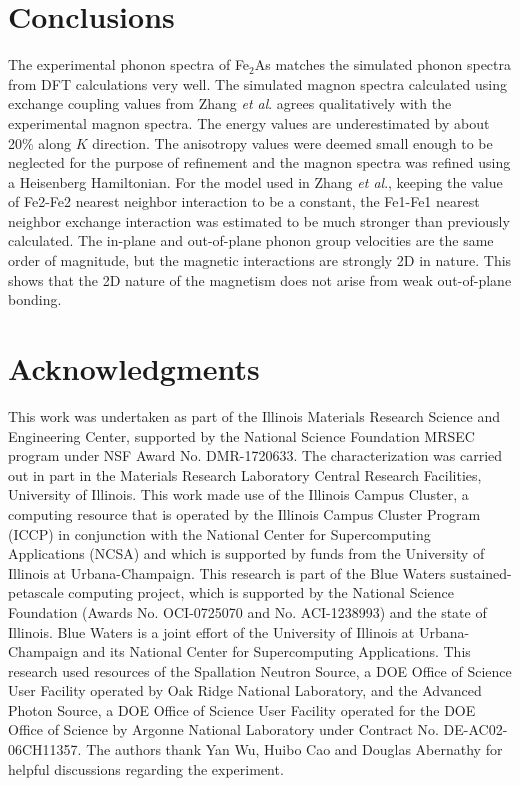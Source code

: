 \documentclass[letterpaper,10pt,doublespacing,edeposit]{uiucthesis2020}
\begin{document}
\begin{mainmatter}
\section{Conclusions}

The experimental phonon spectra of Fe$_2$As matches the simulated phonon spectra from DFT calculations very well. The simulated magnon spectra calculated using exchange coupling values from Zhang \emph{et al}. agrees qualitatively with the experimental magnon spectra. The energy values are underestimated by about 20\% along $K$ direction. The anisotropy values were deemed small enough to be neglected for the purpose of refinement and the magnon spectra was refined using a Heisenberg Hamiltonian. For the model used in Zhang \emph{et al}., keeping the value of Fe2-Fe2 nearest neighbor interaction to be a constant, the Fe1-Fe1 nearest neighbor exchange interaction was estimated to be much stronger than previously calculated. 
The in-plane and out-of-plane phonon group velocities are the same order of magnitude, but the magnetic interactions are strongly 2D in nature. This shows that the 2D nature of the magnetism does not arise from weak out-of-plane bonding.

\section{Acknowledgments}

This work was undertaken as part of the Illinois Materials Research Science and Engineering Center, supported by the National Science Foundation MRSEC program under NSF Award No. DMR-1720633. The characterization was carried out in part in the Materials Research Laboratory Central Research Facilities, University of Illinois. This work made use of the Illinois Campus Cluster, a computing resource that is operated by the Illinois Campus Cluster Program (ICCP) in conjunction with the National Center for Supercomputing Applications (NCSA) and which is supported by funds from the University of Illinois at Urbana-Champaign. This research is part of the Blue Waters sustained-petascale computing project, which is supported by the National Science Foundation (Awards No. OCI-0725070 and No. ACI-1238993) and the state of Illinois. Blue Waters is a joint effort of the University of Illinois at Urbana-Champaign and its National Center for Supercomputing Applications. This research used resources of the Spallation Neutron Source, a DOE Office of Science User Facility operated by Oak Ridge National Laboratory, and the Advanced Photon Source, a DOE Office of Science User Facility operated for the DOE Office of Science by Argonne National Laboratory under Contract No. DE-AC02-06CH11357. The authors thank Yan Wu, Huibo Cao and Douglas Abernathy for helpful discussions regarding the experiment.


\end{mainmatter}
\end{document}
